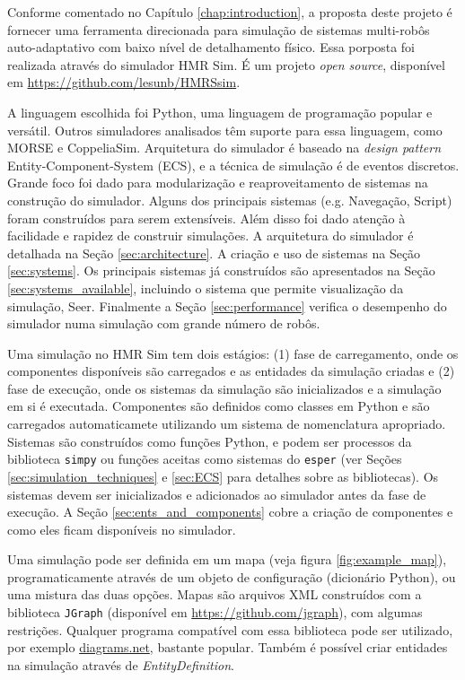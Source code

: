 \label{chapter:hmr_sim}

Conforme comentado no Capítulo \ref{chap:introduction}, a proposta deste projeto é fornecer uma ferramenta direcionada para simulação de sistemas multi-robôs auto-adaptativo com baixo nível de detalhamento físico. Essa porposta foi realizada através do simulador HMR Sim. É um projeto \textit{open source}, disponível em \url{https://github.com/lesunb/HMRSsim}.

A linguagem escolhida foi Python, uma linguagem de programação popular e versátil. Outros simuladores analisados têm suporte para essa linguagem, como MORSE e CoppeliaSim. Arquitetura do simulador é baseado na \textit{design pattern} Entity-Component-System (ECS), e a técnica de simulação é de eventos discretos. Grande foco foi dado para modularização e reaproveitamento de sistemas na construção do simulador. Alguns dos principais sistemas (e.g. Navegação, Script) foram construídos para serem extensíveis. Além disso foi dado atenção à facilidade e rapidez de construir simulações. A arquitetura do simulador é detalhada na Seção \ref{sec:architecture}. A criação e uso de sistemas na Seção \ref{sec:systems}. Os principais sistemas já construídos são apresentados na Seção \ref{sec:systems_available}, incluindo o sistema que permite visualização da simulação, Seer. Finalmente a Seção \ref{sec:performance} verifica o desempenho do simulador numa simulação com grande número de robôs.

Uma simulação no HMR Sim tem dois estágios: (1) fase de carregamento, onde os componentes disponíveis são carregados e as entidades da simulação criadas e (2) fase de execução, onde os sistemas da simulação são inicializados e a simulação em si é executada. Componentes são definidos como classes em Python e são carregados automaticamete utilizando um sistema de nomenclatura apropriado. Sistemas são construídos como funções Python, e podem ser processos da biblioteca \texttt{simpy} ou funções aceitas como sistemas do \texttt{esper} (ver Seções \ref{sec:simulation_techniques} e \ref{sec:ECS} para detalhes sobre as bibliotecas). Os sistemas devem ser inicializados e adicionados ao simulador antes da fase de execução. A Seção \ref{sec:ents_and_components} cobre a criação de componentes e como eles ficam disponíveis no simulador.

Uma simulação pode ser definida em um mapa (veja figura \ref{fig:example_map}), programaticamente através de um objeto de configuração (dicionário Python), ou uma mistura das duas opções. Mapas são arquivos XML construídos com a biblioteca \texttt{JGraph} (disponível em \url{https://github.com/jgraph}), com algumas restrições. Qualquer programa compatível com essa biblioteca pode ser utilizado, por exemplo \url{diagrams.net}, bastante popular. Também é possível criar entidades na simulação através de \textit{EntityDefinition}.

